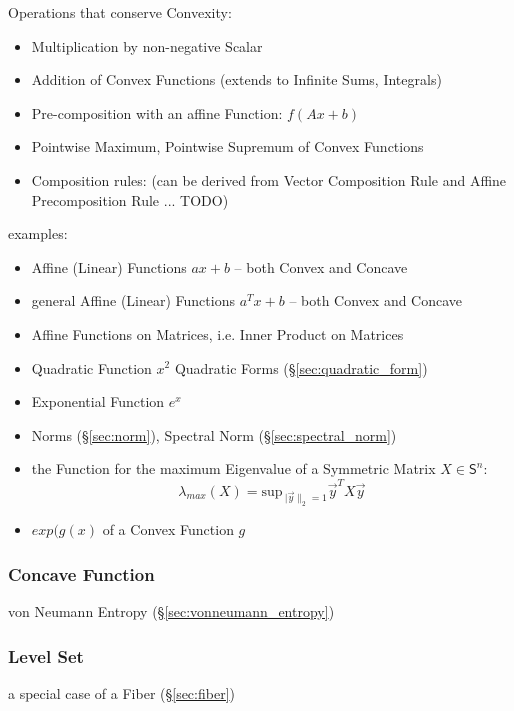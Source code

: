 Operations that conserve Convexity:
\begin{itemize}
  \item Multiplication by non-negative Scalar
  \item Addition of Convex Functions (extends to Infinite Sums, Integrals)
  \item Pre-composition with an affine Function: $f(Ax + b)$
  \item Pointwise Maximum, Pointwise Supremum of Convex Functions
  \item Composition rules: (can be derived from Vector Composition Rule and
    Affine Precomposition Rule ... TODO)
\end{itemize}

examples:
\begin{itemize}
  \item Affine (Linear) Functions $ax + b$ -- both Convex and Concave
  \item general Affine (Linear) Functions $a^T x + b$ -- both Convex and Concave
  \item Affine Functions on Matrices, i.e. Inner Product on Matrices
  \item Quadratic Function $x^2$ \fist Quadratic Forms
    (\S\ref{sec:quadratic_form})
  \item Exponential Function $e^x$
  \item Norms (\S\ref{sec:norm}), Spectral Norm (\S\ref{sec:spectral_norm})
  \item the Function for the maximum Eigenvalue of a Symmetric Matrix $X \in
    \mathsf{S}^n$:
    \[
      \lambda_{max}(X) = \mathrm{sup}_{\ |\vec{y}\|_2=1} \vec{y}^T X \vec{y}
    \]
  \item $exp (g(x)$ of a Convex Function $g$
\end{itemize}



\subsubsection{Concave Function}\label{sec:concave_function}

\fist von Neumann Entropy (\S\ref{sec:vonneumann_entropy})



\subsubsection{Level Set}\label{sec:level_set}

a special case of a Fiber (\S\ref{sec:fiber})



